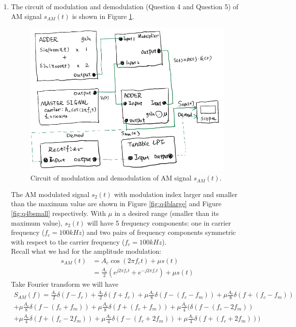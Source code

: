 \documentclass[11pt]{article}
\begin{document}
\begin{enumerate}[label=(\alph*)]
\item %
The circuit of modulation and demodulation (Question 4 and Question 5) of AM signal $s_{AM}(t)$ is shown in Figure \ref{fig:45circuit}.
\begin{figure}[H]
    \centering
    \includegraphics[scale=0.7]{45circuit.PNG}
    \caption{\label{fig:45circuit}Circuit of modulation and demodulation of AM signal $s_{AM}(t)$.}
\end{figure}

The AM modulated signal $s_2 (t)$ with modulation index larger and smaller than the maximum value are shown in Figure \ref{fig:q4blarge} and Figure \ref{fig:q4bsmall} respectively. With $\mu$ in a desired range (smaller than its maximum value), $s_2 (t)$ will have 5 frequency components: one in carrier frequency ($f_c=100kHz$) and two pairs of frequency components symmetric with respect to the carrier frequency ($f_c=100kHz$).\\
Recall what we had for the amplitude modulation:
\begin{align*}
    s_{AM}(t)& = A_c \cos(2\pi f_c t)+\mu s(t) \\
    &= \frac{A_c}{2} (e^{j2\pi f_c t}+e^{-j2\pi f_c t})+\mu s(t)
\end{align*}
Take Fourier transform we will have
\begin{align*}
    S_{AM}(f) = \frac{A_c}{2} \delta(f-f_c)+\frac{A_c}{2}\delta(f+f_c) +\mu\frac{A_c}{8} \delta (f-(f_c-f_m)) +\mu\frac{A_c}{8}\delta (f+(f_c-f_m)) \\ + \mu\frac{A_c}{8}\delta (f-(f_c+f_m)) + \mu\frac{A_c}{8}\delta (f+(f_c+f_m))
    +\mu\frac{A_c}{4} (\delta (f-(f_c-2f_m)) \\ +\mu\frac{A_c}{4}\delta (f+(f_c-2f_m)) +\mu\frac{A_c}{4}\delta (f-(f_c+2f_m)) +\mu\frac{A_c}{4}\delta (f+(f_c+2f_m)))
\end{align*}


\end{enumerate}
\end{document}
